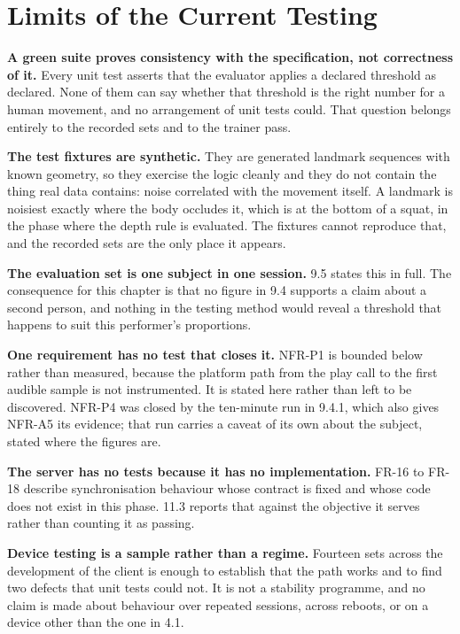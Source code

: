 \section{Limits of the Current Testing}
\label{sec:10.5}

\textbf{A green suite proves consistency with the specification, not correctness of it.} Every unit test asserts that the evaluator applies a declared threshold as declared. None of them can say whether that threshold is the right number for a human movement, and no arrangement of unit tests could. That question belongs entirely to the recorded sets and to the trainer pass.

\textbf{The test fixtures are synthetic.} They are generated landmark sequences with known geometry, so they exercise the logic cleanly and they do not contain the thing real data contains: noise correlated with the movement itself. A landmark is noisiest exactly where the body occludes it, which is at the bottom of a squat, in the phase where the depth rule is evaluated. The fixtures cannot reproduce that, and the recorded sets are the only place it appears.

\textbf{The evaluation set is one subject in one session.} 9.5 states this in full. The consequence for this chapter is that no figure in 9.4 supports a claim about a second person, and nothing in the testing method would reveal a threshold that happens to suit this performer's proportions.

\textbf{One requirement has no test that closes it.} NFR-P1 is bounded below rather than measured, because the platform path from the play call to the first audible sample is not instrumented. It is stated here rather than left to be discovered. NFR-P4 was closed by the ten-minute run in 9.4.1, which also gives NFR-A5 its evidence; that run carries a caveat of its own about the subject, stated where the figures are.

\textbf{The server has no tests because it has no implementation.} FR-16 to FR-18 describe synchronisation behaviour whose contract is fixed and whose code does not exist in this phase. 11.3 reports that against the objective it serves rather than counting it as passing.

\textbf{Device testing is a sample rather than a regime.} Fourteen sets across the development of the client is enough to establish that the path works and to find two defects that unit tests could not. It is not a stability programme, and no claim is made about behaviour over repeated sessions, across reboots, or on a device other than the one in 4.1.
